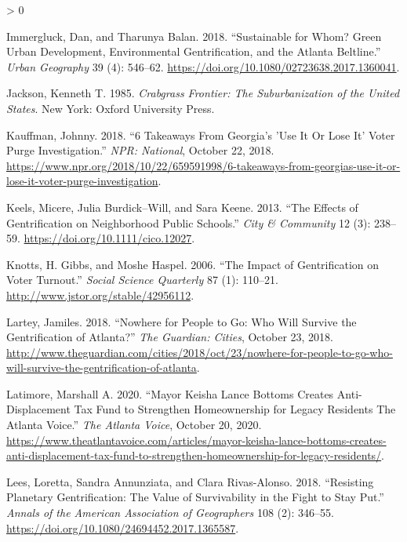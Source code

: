 \documentclass[
  12pt,
]{article}
\newlength{\cslhangindent}
\newenvironment{CSLReferences}[2] %
 {%
  \setlength{\parindent}{0pt}
  \ifodd #1 \everypar{\setlength{\hangindent}{\cslhangindent}}\ignorespaces\fi
  \ifnum #2 > 0
  \setlength{\parskip}{#2\baselineskip}
  \fi
 }%
 {}
\begin{document}
\begin{CSLReferences}{1}{0}
\leavevmode\hypertarget{ref-Immergluck2018}{}%
Immergluck, Dan, and Tharunya Balan. 2018. {``Sustainable for Whom? {Green} Urban Development, Environmental Gentrification, and the {Atlanta Beltline}.''} \emph{Urban Geography} 39 (4): 546--62. \url{https://doi.org/10.1080/02723638.2017.1360041}.

\leavevmode\hypertarget{ref-Jackson1985}{}%
Jackson, Kenneth T. 1985. \emph{Crabgrass Frontier: The Suburbanization of the {United States}}. {New York}: {Oxford University Press}.

\leavevmode\hypertarget{ref-Kauffman2018}{}%
Kauffman, Johnny. 2018. {``6 {Takeaways From Georgia}'s '{Use It Or Lose It}' {Voter Purge Investigation}.''} \emph{NPR: National}, October 22, 2018. \url{https://www.npr.org/2018/10/22/659591998/6-takeaways-from-georgias-use-it-or-lose-it-voter-purge-investigation}.

\leavevmode\hypertarget{ref-Keels2013}{}%
Keels, Micere, Julia Burdick--Will, and Sara Keene. 2013. {``The {Effects} of {Gentrification} on {Neighborhood Public Schools}.''} \emph{City \& Community} 12 (3): 238--59. \url{https://doi.org/10.1111/cico.12027}.

\leavevmode\hypertarget{ref-Knotts2006}{}%
Knotts, H. Gibbs, and Moshe Haspel. 2006. {``The {Impact} of {Gentrification} on {Voter Turnout}.''} \emph{Social Science Quarterly} 87 (1): 110--21. \url{http://www.jstor.org/stable/42956112}.

\leavevmode\hypertarget{ref-Lartey2018}{}%
Lartey, Jamiles. 2018. {``Nowhere for People to Go: Who Will Survive the Gentrification of {Atlanta}?''} \emph{The Guardian: Cities}, October 23, 2018. \url{http://www.theguardian.com/cities/2018/oct/23/nowhere-for-people-to-go-who-will-survive-the-gentrification-of-atlanta}.

\leavevmode\hypertarget{ref-Latimore2020}{}%
Latimore, Marshall A. 2020. {``Mayor {Keisha Lance Bottoms} Creates Anti-Displacement Tax Fund to Strengthen Homeownership for Legacy Residents \textbar{} {The Atlanta Voice}.''} \emph{The Atlanta Voice}, October 20, 2020. \url{https://www.theatlantavoice.com/articles/mayor-keisha-lance-bottoms-creates-anti-displacement-tax-fund-to-strengthen-homeownership-for-legacy-residents/}.

\leavevmode\hypertarget{ref-Lees2018}{}%
Lees, Loretta, Sandra Annunziata, and Clara Rivas-Alonso. 2018. {``Resisting {Planetary Gentrification}: {The Value} of {Survivability} in the {Fight} to {Stay Put}.''} \emph{Annals of the American Association of Geographers} 108 (2): 346--55. \url{https://doi.org/10.1080/24694452.2017.1365587}.


\end{CSLReferences}
\end{document}
